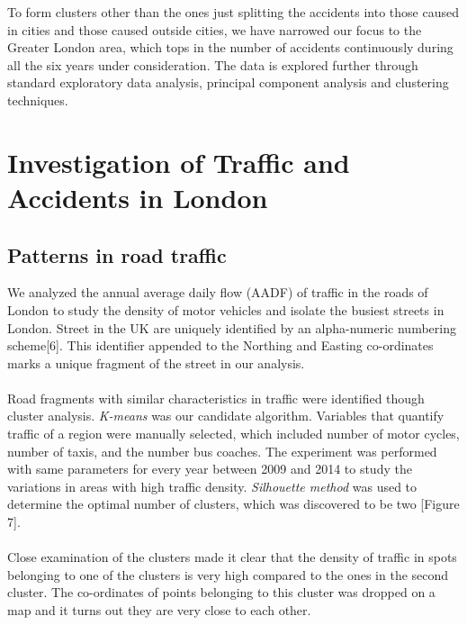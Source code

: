 \documentclass[a4paper, 11pt]{article}
\begin{document}
To form clusters other than the ones just splitting the accidents into those caused in cities and those caused outside cities, we have narrowed our focus to the Greater London area, which tops in the number of accidents continuously during all the six years under consideration. The data is explored further through standard exploratory data analysis,
principal component analysis and clustering techniques.

\section{Investigation of Traffic and Accidents in London}
\subsection{Patterns in road traffic}
We analyzed the annual average daily flow (AADF) of traffic in the roads of London to study the density of motor vehicles and isolate the busiest streets in London. Street in the UK are uniquely identified by an alpha-numeric numbering scheme[6]. This identifier appended to the Northing and Easting co-ordinates marks a unique fragment of the street in our analysis. \\ \\

Road fragments with similar characteristics in traffic were identified though cluster analysis.
\textit{K-means} was our candidate algorithm. Variables that quantify traffic of a region were manually selected, which included number of motor cycles, number of taxis, and the number bus coaches. The  experiment was performed with same parameters for every year between 2009 and 2014 to study the variations in areas with high traffic density. \textit{Silhouette method} was used to determine the optimal number of clusters, which was discovered to be two [Figure 7].\\ \\

Close examination of the clusters made it clear that the density of traffic in spots belonging to one of the clusters is very high compared to the ones in the second cluster. The co-ordinates of points belonging to this cluster was dropped on a map and it turns out they are very close to each other.\\ \\
\end{document}
